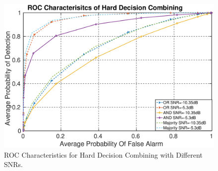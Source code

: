 \begin{figure}[ht!]
	\centering
	\includegraphics[width=\textwidth,keepaspectratio]{images/Gill/figs/hardecisioroc.eps}
    \caption{ROC Characteristics for Hard Decision Combining with Different SNRs.} 
\label{hardroc}      
\end{figure}

